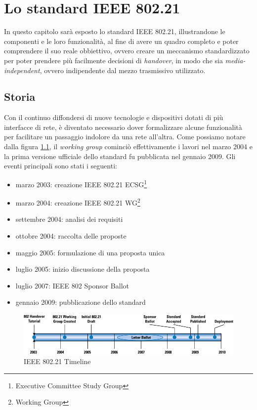 \chapter{Lo standard IEEE 802.21}

In questo capitolo sarà esposto lo standard IEEE 802.21\cite{ieee80221}, illustrandone le componenti e le loro funzionalità, al fine di avere un quadro completo e poter comprendere il suo reale obbiettivo, ovvero creare un meccanismo standardizzato per poter prendere più facilmente decisioni di {\em handover}, in modo che sia {\em media-independent}, ovvero indipendente dal mezzo trasmissivo utilizzato.

\section{Storia}
Con il continuo diffondersi di nuove tecnologie e dispositivi dotati di più interfacce di rete, è diventato necessario dover formalizzare alcune funzionalità per facilitare un passaggio indolore da una rete all'altra.
Come possiamo notare dalla figura \ref{fig:timeline}, il {\em working group} cominciò effettivamente i lavori nel marzo 2004 e la prima versione ufficiale dello standard fu pubblicata nel gennaio 2009. Gli eventi principali sono stati i seguenti:
\begin{itemize}
\item marzo 2003: creazione IEEE 802.21 ECSG\footnote{Executive Committee Study Group}
\item marzo 2004: creazione IEEE 802.21 WG\footnote{Working Group}
\item settembre 2004: analisi dei requisiti
\item ottobre 2004: raccolta delle proposte
\item maggio 2005: formulazione di una proposta unica
\item luglio 2005: inizio discussione della proposta
\item luglio 2007: IEEE 802 Sponsor Ballot\cite{balloting}
\item gennaio 2009: pubblicazione dello standard
\end{itemize}

\begin{figure}[h!]
\centering
\hspace*{-1em}\includegraphics[scale=0.5]{ieee_timeline.jpg}
\caption{IEEE 802.21 Timeline}
\label{fig:timeline}
\end{figure}

